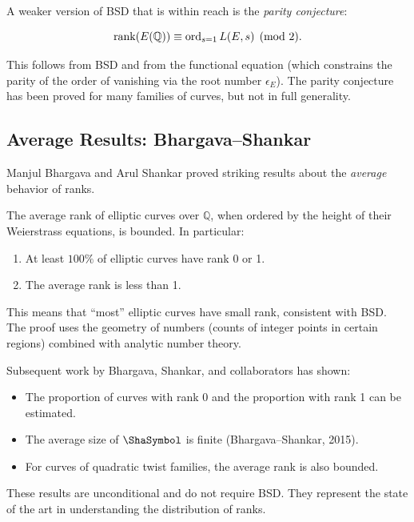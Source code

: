 A weaker version of BSD that is within reach is the \emph{parity conjecture}:

\begin{conjecture}
\[
\operatorname{rank}(E(\mathbb{Q})) \equiv \operatorname{ord}_{s=1} L(E, s) \pmod{2}.
\]
\end{conjecture}

This follows from BSD and from the functional equation (which constrains the parity of the order of vanishing via the root number $\epsilon_E$). The parity conjecture has been proved for many families of curves, but not in full generality.

\subsection{Average Results: Bhargava--Shankar}

Manjul Bhargava and Arul Shankar proved striking results about the \emph{average} behavior of ranks.

\begin{theorem}
The average rank of elliptic curves over $\mathbb{Q}$, when ordered by the height of their Weierstrass equations, is bounded. In particular:
\begin{enumerate}
\item At least $100\%$ of elliptic curves have rank 0 or 1.
\item The average rank is less than 1.
\end{enumerate}
\end{theorem}

This means that ``most'' elliptic curves have small rank, consistent with BSD. The proof uses the geometry of numbers (counts of integer points in certain regions) combined with analytic number theory.

Subsequent work by Bhargava, Shankar, and collaborators has shown:
\begin{itemize}
\item The proportion of curves with rank 0 and the proportion with rank 1 can be estimated.
\item The average size of $\Sha$ is finite (Bhargava--Shankar, 2015).
\item For curves of quadratic twist families, the average rank is also bounded.
\end{itemize}

These results are unconditional and do not require BSD. They represent the state of the art in understanding the distribution of ranks.

